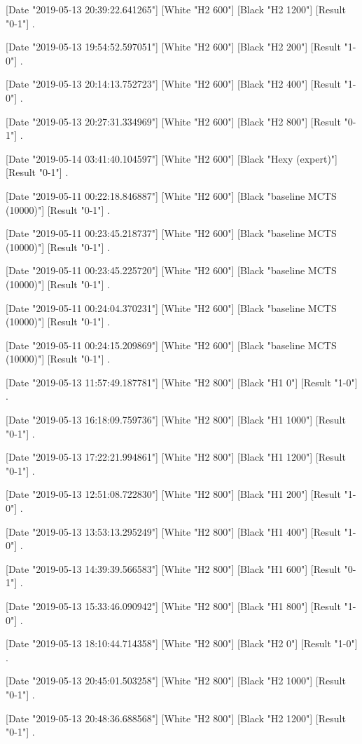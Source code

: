 {[Date "2019-05-13 20:39:22.641265"]
[White "H2 600"]
[Black "H2 1200"]
[Result "0-1"]
.

[Date "2019-05-13 19:54:52.597051"]
[White "H2 600"]
[Black "H2 200"]
[Result "1-0"]
.

[Date "2019-05-13 20:14:13.752723"]
[White "H2 600"]
[Black "H2 400"]
[Result "1-0"]
.

[Date "2019-05-13 20:27:31.334969"]
[White "H2 600"]
[Black "H2 800"]
[Result "0-1"]
.

[Date "2019-05-14 03:41:40.104597"]
[White "H2 600"]
[Black "Hexy (expert)"]
[Result "0-1"]
.

[Date "2019-05-11 00:22:18.846887"]
[White "H2 600"]
[Black "baseline MCTS (10000)"]
[Result "0-1"]
.

[Date "2019-05-11 00:23:45.218737"]
[White "H2 600"]
[Black "baseline MCTS (10000)"]
[Result "0-1"]
.

[Date "2019-05-11 00:23:45.225720"]
[White "H2 600"]
[Black "baseline MCTS (10000)"]
[Result "0-1"]
.

[Date "2019-05-11 00:24:04.370231"]
[White "H2 600"]
[Black "baseline MCTS (10000)"]
[Result "0-1"]
.

[Date "2019-05-11 00:24:15.209869"]
[White "H2 600"]
[Black "baseline MCTS (10000)"]
[Result "0-1"]
.

[Date "2019-05-13 11:57:49.187781"]
[White "H2 800"]
[Black "H1 0"]
[Result "1-0"]
.

[Date "2019-05-13 16:18:09.759736"]
[White "H2 800"]
[Black "H1 1000"]
[Result "0-1"]
.

[Date "2019-05-13 17:22:21.994861"]
[White "H2 800"]
[Black "H1 1200"]
[Result "0-1"]
.

[Date "2019-05-13 12:51:08.722830"]
[White "H2 800"]
[Black "H1 200"]
[Result "1-0"]
.

[Date "2019-05-13 13:53:13.295249"]
[White "H2 800"]
[Black "H1 400"]
[Result "1-0"]
.

[Date "2019-05-13 14:39:39.566583"]
[White "H2 800"]
[Black "H1 600"]
[Result "0-1"]
.

[Date "2019-05-13 15:33:46.090942"]
[White "H2 800"]
[Black "H1 800"]
[Result "1-0"]
.

[Date "2019-05-13 18:10:44.714358"]
[White "H2 800"]
[Black "H2 0"]
[Result "1-0"]
.

[Date "2019-05-13 20:45:01.503258"]
[White "H2 800"]
[Black "H2 1000"]
[Result "0-1"]
.

[Date "2019-05-13 20:48:36.688568"]
[White "H2 800"]
[Black "H2 1200"]
[Result "0-1"]
.

}
